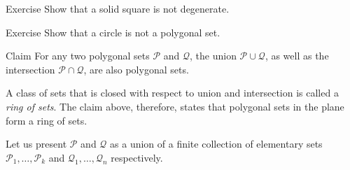 \begin{thm}{Exercise}\label{ex:solid-square}
Show that a solid square is not degenerate.
\end{thm}

\begin{thm}{Exercise}\label{ex:poly-circ}
Show that a circle is not a polygonal set.
\end{thm}

\begin{thm}{Claim}\label{clm:poly-ring}
For any two polygonal sets $\mathcal{P}$ and $\mathcal{Q}$,
the union $\mathcal{P}\cup\mathcal{Q}$, 
as well as the intersection $\mathcal{P}\cap\mathcal{Q}$, 
are also polygonal sets.
\end{thm}

A class of sets that is closed with respect to union and intersection is called a {}\emph{ring of sets}.
The claim above, therefore, states that polygonal sets in the plane form a ring of sets.

Let us present $\mathcal{P}$ and $\mathcal{Q}$
as a union of a finite collection of elementary sets $\mathcal{P}_1,\dots,\mathcal{P}_k$ 
and $\mathcal{Q}_1,\dots,\mathcal{Q}_n$ respectively.

